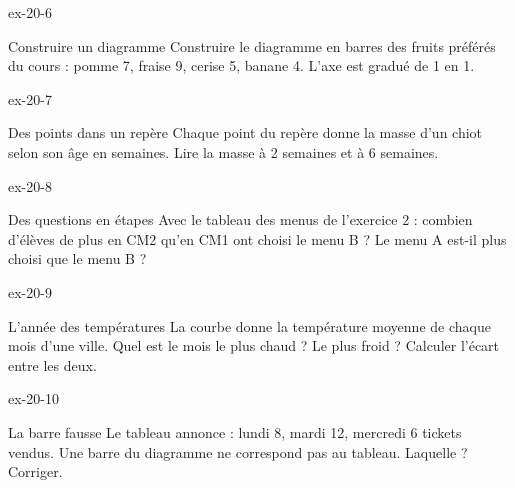 \begin{blocLivre}{ex-20-6}\begin{exercice}[2]{Construire un diagramme}
Construire le diagramme en barres des fruits préférés du cours : pomme 7, fraise 9, cerise 5, banane 4. L’axe est gradué de 1 en 1.
\label{fig-ex-20-6}
\end{exercice}\end{blocLivre}
\begin{blocLivre}{ex-20-7}\begin{exercice}[2]{Des points dans un repère}
Chaque point du repère donne la masse d’un chiot selon son âge en semaines. Lire la masse à 2 semaines et à 6 semaines.
\label{fig-ex-20-7}
\end{exercice}\end{blocLivre}
\begin{blocLivre}{ex-20-8}\begin{exercice}[2]{Des questions en étapes}
Avec le tableau des menus de l’exercice 2 : combien d’élèves de plus en CM2 qu’en CM1 ont choisi le menu B ? Le menu A est-il plus choisi que le menu B ?
\end{exercice}\end{blocLivre}
\begin{blocLivre}{ex-20-9}\begin{exercice}[2]{L’année des températures}
La courbe donne la température moyenne de chaque mois d’une ville. Quel est le mois le plus chaud ? Le plus froid ? Calculer l’écart entre les deux.
\label{fig-ex-20-9}
\end{exercice}\end{blocLivre}
\begin{blocLivre}{ex-20-10}\begin{exercice}[2]{La barre fausse}
Le tableau annonce : lundi 8, mardi 12, mercredi 6 tickets vendus. Une barre du diagramme ne correspond pas au tableau. Laquelle ? Corriger.
\label{fig-ex-20-10}
\end{exercice}\end{blocLivre}

